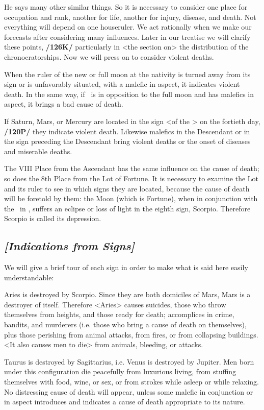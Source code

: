 He says many other similar things. So it is necessary to consider one place for occupation and rank, another for life, another for injury, disease, and death. Not everything will depend on one houseruler. We act rationally when we make our forecasts after considering many influences. Later in our treatise we will clarify these points, \textbf{/126K/} particularly in <the section on> the distribution of the chronocratorships. Now we will press on to consider violent deaths. 

When the ruler of the new or full moon at the nativity is turned away from its sign or is unfavorably situated, with a malefic in aspect, it indicates violent death. In the same way, if \Mercury\, is in opposition to the full moon and has malefics in aspect, it brings a bad cause of death. 

If Saturn, Mars, or Mercury are located in the sign <of the \Moon> on the fortieth day, \textbf{/120P/} they indicate violent death. Likewise malefics in the Descendant or
in the sign preceding the Descendant bring violent deaths or the onset of diseases and miserable deaths.

The VIII Place from the Ascendant has the same influence on the cause of death; so does the 8th Place from the Lot of Fortune. It is necessary to examine the Lot and its ruler to see in which signs they are located, because the cause of death will be foretold by them: the Moon (which is Fortune), when in conjunction with the \Sun\, in \Aries, suffers an eclipse or loss of light in the eighth sign, Scorpio. Therefore Scorpio is called its depression.

\subsection{\textit{[Indications from Signs]}}
We will give a brief tour of each sign in order to make what is said here easily understandable:

Aries \mn{\Aries} is destroyed by Scorpio. Since they are both domiciles of Mars, Mars is a destroyer of itself. Therefore <Aries> causes suicides, those who throw themselves from heights, and those ready for death;
accomplices in crime, bandits, and murderers (i.e. those who bring a cause of death on themselves), plus those perishing from animal attacks, from fires, or from collapsing buildings. <It also causes men to die> from animals, bleeding, or attacks.

Taurus \mn{\Taurus} is destroyed by Sagittarius, i.e. Venus is destroyed by Jupiter. Men born under this configuration die peacefully from luxurious living, from stuffing themselves with food, wine, or sex, or from strokes
while asleep or while relaxing. No distressing cause of death will appear, unless some malefic in conjunction or in aspect introduces and indicates a cause of death appropriate to its nature.

